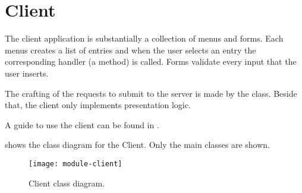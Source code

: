 \section{Client}\label{sec:client}

The client application is substantially a collection of menus and forms. Each
menus creates a list of entries and when the user selects an entry the
corresponding handler (a method) is called. Forms validate every input that the
user inserts.

The crafting of the requests to submit to the server is made by the
 class. Beside that, the client only implements presentation
logic.

A guide to use the client can be found in .

 shows the class diagram for the Client. Only the main
classes are shown.

\begin{figure}[htb]
	\texttt{[image: module-client]}
	\caption{Client class diagram.}\label{fig:client}
\end{figure}
